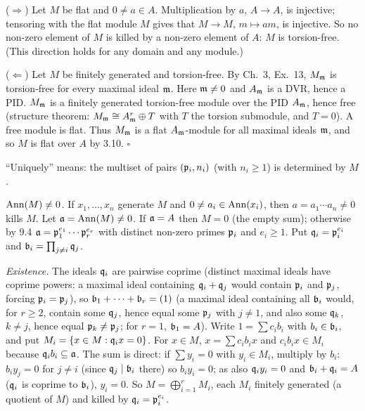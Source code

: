 \documentclass[11pt]{article}
\begin{document}
($\Rightarrow$) Let $M$ be flat and $0\ne a\in A$. Multiplication by $a$, $A\to A$, is injective; tensoring with the flat module $M$ gives that $M\to M$, $m\mapsto am$, is injective. So no non-zero element of $M$ is killed by a non-zero element of $A$: $M$ is torsion-free. (This direction holds for any domain and any module.)

($\Leftarrow$) Let $M$ be finitely generated and torsion-free. By Ch.~3, Ex.~13, $M_\mathfrak m$ is torsion-free for every maximal ideal $\mathfrak m$. Here $\mathfrak m\ne0$ and $A_\mathfrak m$ is a DVR, hence a PID. $M_\mathfrak m$ is a finitely generated torsion-free module over the PID $A_\mathfrak m$, hence free (structure theorem: $M_\mathfrak m\cong A_\mathfrak m^r\oplus T$ with $T$ the torsion submodule, and $T=0$). A free module is flat. Thus $M_\mathfrak m$ is a flat $A_\mathfrak m$-module for all maximal ideals $\mathfrak m$, and so $M$ is flat over $A$ by 3.10. \hfill$\square$

\pf
``Uniquely'' means: the multiset of pairs $(\mathfrak p_i,n_i)$ (with $n_i\ge1$) is determined by $M$.

\emph{$\operatorname{Ann}(M)\ne0$.} If $x_1,\dots,x_n$ generate $M$ and $0\ne a_i\in\operatorname{Ann}(x_i)$, then $a=a_1\cdots a_n\ne0$ kills $M$. Let $\mathfrak a=\operatorname{Ann}(M)\ne0$. If $\mathfrak a=A$ then $M=0$ (the empty sum); otherwise by 9.4 $\mathfrak a=\mathfrak p_1^{e_1}\cdots\mathfrak p_r^{e_r}$ with distinct non-zero primes $\mathfrak p_i$ and $e_i\ge1$. Put $\mathfrak q_i=\mathfrak p_i^{e_i}$ and $\mathfrak b_i=\prod_{j\ne i}\mathfrak q_j$.

\emph{Existence.} The ideals $\mathfrak q_i$ are pairwise coprime (distinct maximal ideals have coprime powers: a maximal ideal containing $\mathfrak q_i+\mathfrak q_j$ would contain $\mathfrak p_i$ and $\mathfrak p_j$, forcing $\mathfrak p_i=\mathfrak p_j$), so $\mathfrak b_1+\dots+\mathfrak b_r=(1)$ (a maximal ideal containing all $\mathfrak b_i$ would, for $r\ge2$, contain some $\mathfrak q_j$, hence equal some $\mathfrak p_j$ with $j\ne1$, and also some $\mathfrak q_k$, $k\ne j$, hence equal $\mathfrak p_k\ne\mathfrak p_j$; for $r=1$, $\mathfrak b_1=A$). Write $1=\sum c_ib_i$ with $b_i\in\mathfrak b_i$, and put $M_i=\{x\in M:\mathfrak q_ix=0\}$. For $x\in M$, $x=\sum c_ib_ix$ and $c_ib_ix\in M_i$ because $\mathfrak q_ib_i\subseteq\mathfrak a$. The sum is direct: if $\sum y_i=0$ with $y_i\in M_i$, multiply by $b_i$: $b_iy_j=0$ for $j\ne i$ (since $\mathfrak q_j\mid\mathfrak b_i$ there) so $b_iy_i=0$; as also $\mathfrak q_iy_i=0$ and $\mathfrak b_i+\mathfrak q_i=A$ ($\mathfrak q_i$ is coprime to $\mathfrak b_i$), $y_i=0$. So $M=\bigoplus_{i=1}^rM_i$, each $M_i$ finitely generated (a quotient of $M$) and killed by $\mathfrak q_i=\mathfrak p_i^{e_i}$.
\end{document}
